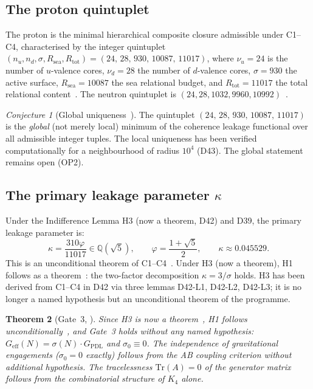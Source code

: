 \documentclass[11pt,a4paper]{article}
\theoremstyle{plain}
\newtheorem{theorem}{Theorem}[section]
\theoremstyle{definition}
\theoremstyle{remark}
\newtheorem{conjecture}[theorem]{Conjecture}
\newcommand{\quintuplet}{(24,\,28,\,930,\,10087,\,11017)}
\newcommand{\Geff}{G_{\mathrm{eff}}}
\newcommand{\GPDL}{G_{\mathrm{PDL}}}
\newcommand{\sigmaN}{\sigma(N)}
\begin{document}
\subsection{The proton quintuplet}
\label{subsec:quintuplet}
The proton is the minimal hierarchical composite closure admissible under C1--C4, characterised by the integer quintuplet $(n_u, n_d, \sigma, R_{\mathrm{sea}}, R_{\mathrm{tot}}) = \quintuplet$, where $\nu_u=24$ is the number of $u$-valence cores, $\nu_d=28$ the number of $d$-valence cores, $\sigma=930$ the active surface, $R_{\mathrm{sea}}=10087$ the sea relational budget, and $R_{\mathrm{tot}}=11017$ the total relational content~\cite{D01,D16,D16a,D16b}. The neutron quintuplet is $(24,28,1032,9960,10992)$~\cite{D22}.

\begin{conjecture}[Global uniqueness~\cite{D16,D16b}]
\label{conj:uniqueness}
The quintuplet $\quintuplet$ is the \emph{global} (not merely local) minimum of the coherence leakage functional over all admissible integer tuples. The local uniqueness has been verified computationally for a neighbourhood of radius $10^4$ (D43). The global statement remains open (OP2).
\end{conjecture}

\subsection{The primary leakage parameter \texorpdfstring{$\kappa$}{kappa}}
\label{subsec:kappa}
Under the Indifference Lemma H3 (now a theorem, D42) and D39, the primary leakage parameter is:
\begin{equation}
\kappa = \frac{310\varphi}{11017} \in \mathbb{Q}(\sqrt{5}), \qquad \varphi = \frac{1+\sqrt{5}}{2}, \qquad \kappa \approx 0.045529.
\end{equation}
This is an unconditional theorem of C1--C4~\cite{D39,D42}. Under H3 (now a theorem), H1 follows as a theorem~\cite{D39}: the two-factor decomposition $\kappa=3/\sigma$ holds. H3 has been derived from C1--C4 in D42 via three lemmas D42-L1, D42-L2, D42-L3; it is no longer a named hypothesis but an unconditional theorem of the programme.

\begin{theorem}[Gate~3, \cite{D36}]
\label{thm:Gate3}
Since H3 is now a theorem~\cite{D42}, H1 follows unconditionally~\cite{D39}, and Gate~3 holds without any named hypothesis: $\Geff(N)=\sigmaN\cdot\GPDL$ and $\sigma_0\equiv 0$. The independence of gravitational engagements ($\sigma_0=0$ exactly) follows from the AB coupling criterion without additional hypothesis. The tracelessness $\mathrm{Tr}(A)=0$ of the generator matrix follows from the combinatorial structure of $K_4$ alone.
\end{theorem}
\end{document}
